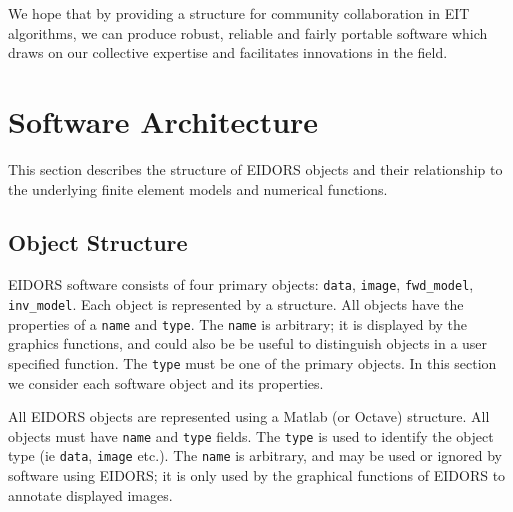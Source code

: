 \documentclass[12pt]{iopart}
\begin{document}
\begin{itemize}
%

\end{itemize}
We hope that by providing a structure for community collaboration
in EIT algorithms, we can produce robust,
reliable and fairly portable software which draws on our collective
expertise and facilitates innovations in the field.

\section{Software Architecture}

This section describes the structure of EIDORS objects
and their relationship to the underlying finite element
models and numerical functions.

\subsection{Object Structure}

EIDORS software consists of four primary objects:
{\tt data},
{\tt image},
{\tt fwd\_model},
{\tt inv\_model}. Each object is represented by a
structure. All objects have the properties of a
{\tt name} and {\tt type}. The {\tt name} is
arbitrary; it is displayed by the graphics functions,
and could also be be useful to distinguish objects
in a user specified function. The {\tt type} must
be one of the primary objects. In this section we
consider each software object and its properties.


All EIDORS objects are represented using a Matlab
(or Octave) structure. All objects must have 
{\tt name} and {\tt type} fields. 
The {\tt type} is used to identify the object type 
(ie {\tt data}, {\tt image} etc.).
The {\tt name} is arbitrary, and may be used or ignored
by software using EIDORS; it is only used by the
graphical functions of EIDORS to annotate displayed images.
\end{document}
